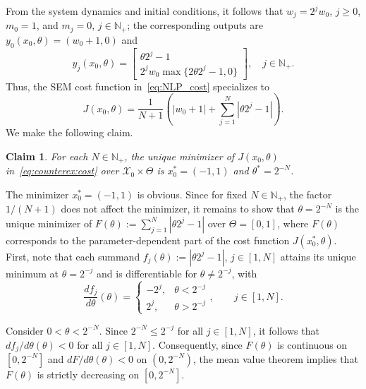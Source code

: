 \documentclass[a4paper,fleqn]{cas-dc}
\newtheorem{claim}{Claim}
\begin{document}
\begin{pf}
	From the system dynamics and initial conditions, it follows that $w_j = 2^jw_0$, $j\geq0$, $m_0 = 1$, and $m_j = 0$, $j\in\mathbb{N}_+$; the corresponding outputs are $y_0(x_0,\theta) =
	(w_0 + 1, 0)$ and
	\begin{equation}\label{eq:outputs}
		y_j(x_0,\theta) = 
		\begin{bmatrix}
			\theta2^j-1\\2^jw_0\max\{2\theta2^j-1,0\}
		\end{bmatrix},\quad 
		j\in\mathbb{N}_+.
	\end{equation}
	Thus, the SEM cost function in~\eqref{eq:NLP_cost} specializes to
	\begin{equation}\label{eq:counterex:cost}
		J(x_0,\theta) = \frac{1}{N+1}\left(|w_0+1| + \sum_{j=1}^N |\theta 2^j-1|\right).
	\end{equation}
	We make the following claim.
	
	\begin{claim}\label{claim:minimizer}
		For each $N\in\mathbb{N}_{+}$, the unique minimizer of $J(x_0,\theta)$ in~\eqref{eq:counterex:cost} over $\mathcal{X}_0\times\Theta$ is $x_0^* = (-1,1)$ and $\theta^*=2^{-N}$.
	\end{claim}
	\begin{pf}
		The minimizer $x_0^*=(-1,1)$ is obvious.
		Since for fixed $N\in\mathbb{N}_{+}$, the factor $1/(N+1)$ does not affect the minimizer, it remains to show that $\theta=2^{-N}$ is the unique minimizer of $F(\theta) := \sum_{j=1}^N|\theta2^j-1|$ over $\Theta=[0,1]$, where $F(\theta)$ corresponds to the parameter-dependent part of the cost function $J(x_0^*,\theta)$.
		First, note that each summand $f_j(\theta):=|\theta2^j-1|$, $j\in[1,N]$ attains its unique minimum at $\theta=2^{-j}$ and is differentiable for $\theta\neq2^{-j}$, with
		\begin{equation}
			\frac{df_j}{d\theta}(\theta) =
			\begin{cases}
				-2^j, & \theta < 2^{-j} \\ 2^j, & \theta>2^{-j}
			\end{cases}, \qquad j\in[1,N].
		\end{equation}
		
		Consider $0<\theta<2^{-N}$. Since $2^{-N}\leq2^{-j}$ for all $j\in[1,N]$, it follows that ${df_j}/{d\theta}(\theta)<0$ for all $j\in[1,N]$.
		Consequently, since $F(\theta)$ is continuous on $[0,2^{-N}]$ and ${dF}/{d\theta}(\theta)<0$ on $(0,2^{-N})$, the mean value theorem implies that $F(\theta)$ is strictly decreasing on $[0,2^{-N}]$.
		

\end{pf}
\end{pf}
\end{document}
